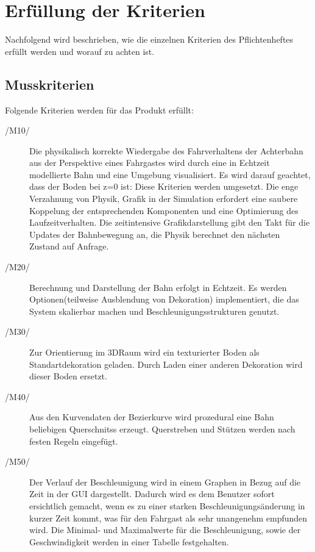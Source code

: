 \chapter{Erfüllung der Kriterien}

Nachfolgend wird beschrieben, wie die einzelnen Kriterien des Pflichtenheftes
erfüllt werden und worauf zu achten ist.
\section{Musskriterien}

Folgende Kriterien werden für das Produkt erfüllt:
\begin{description}
	\item[/M10/] Die physikalisch korrekte Wiedergabe des Fahrverhaltens der Achterbahn aus der Perspektive eines Fahrgastes wird durch eine in Echtzeit modellierte Bahn und eine Umgebung visualisiert. Es wird darauf geachtet, dass der Boden bei z=0 ist: Diese Kriterien werden umgesetzt. Die enge Verzahnung von Physik, Grafik in der Simulation erfordert eine saubere Koppelung der entsprechenden Komponenten und
eine Optimierung des Laufzeitverhalten. Die zeitintensive Grafikdarstellung gibt den Takt für die Updates der Bahnbewegung an, die Physik berechnet den nächsten Zustand auf Anfrage.
	\item[/M20/] Berechnung und Darstellung der Bahn erfolgt in Echtzeit. Es werden Optionen(teilweise Ausblendung von Dekoration) implementiert, die das System skalierbar machen und Beschleunigungsstrukturen genutzt.
	\item[/M30/] Zur Orientierung im 3DRaum wird ein texturierter Boden als Standartdekoration geladen. Durch Laden einer anderen Dekoration wird dieser Boden ersetzt.
	\item[/M40/] Aus den Kurvendaten der Bezierkurve wird prozedural eine Bahn beliebigen Querschnitss erzeugt. Querstreben und Stützen werden nach festen Regeln eingefügt.
	\item[/M50/] Der Verlauf der Beschleunigung wird in einem Graphen in Bezug auf die Zeit in der GUI dargestellt. Dadurch wird es dem Benutzer sofort ersichtlich gemacht, wenn es zu einer starken Beschleunigungsänderung in kurzer Zeit kommt, was für den Fahrgast als sehr unangenehm empfunden wird. Die Minimal- und Maximalwerte für die Beschleunigung, sowie der Geschwindigkeit werden in einer Tabelle festgehalten.
\end{description}


